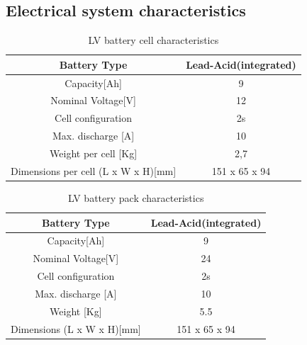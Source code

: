 \subsection{Electrical system characteristics}
\begin{table}[h]
    \centering
    \begin{adjustbox}{width=\textwidth,center}
    \begin{tabular}{|c|c|}
       \hline
       Battery Type & Lead-Acid(integrated)\\
       \hline
       Capacity[Ah] & 9 \\
       \hline
       Nominal Voltage[V] & 12 \\
       \hline
       Cell configuration & 2s \\
       \hline
       Max. discharge [A] & 10 \\
       \hline
       Weight per cell [Kg] & 2,7 \\
       \hline 
       Dimensions per cell (L x W x H)[mm] & 151 x 65 x 94 \\
       \hline 
    \end{tabular}
    \end{adjustbox}
    \label{Low Voltage Cell Specs}
    \caption{LV battery cell characteristics}
\end{table}    

\begin{table}[h]
    \centering
    \begin{adjustbox}{width=\textwidth,center}
    \begin{tabular}{|c|c|}
       \hline
       Battery Type & Lead-Acid(integrated)\\
       \hline
       Capacity[Ah] & 9 \\
       \hline
       Nominal Voltage[V] & 24 \\
       \hline
       Cell configuration & 2s \\
       \hline
       Max. discharge [A] & 10 \\
       \hline
       Weight [Kg] & 5.5 \\
       \hline 
       Dimensions (L x W x H)[mm] & 151 x 65 x 94 \\
       \hline 
    \end{tabular}
    \end{adjustbox}
    \label{Low Voltage Battery Specs}
    \caption{LV battery pack characteristics}
\end{table}    

